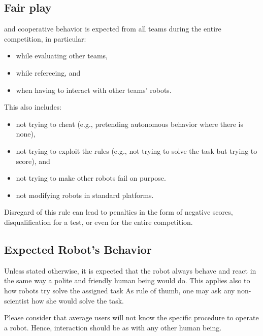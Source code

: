 \subsection{Fair play}
\label{rule:fairplay}
 and cooperative behavior is expected from all teams during the entire competition, in particular:
\begin{itemize}
	\item while evaluating other teams,
	\item while refereeing, and
	\item when having to interact with other teams' robots.
\end{itemize}
This also includes:
\begin{itemize}
	\item not trying to cheat (e.g., pretending autonomous behavior where there is none),
	\item not trying to exploit the rules (e.g., not trying to solve the task but trying to score), and
	\item not trying to make other robots fail on purpose.
	\item not modifying robots in standard platforms.
\end{itemize}
Disregard of this rule can lead to penalties in the form of negative scores, disqualification for a test, or even for the entire competition.

\subsection{Expected Robot's Behavior}
Unless stated otherwise, it is expected that the robot always behave and react in the same way a polite and friendly human being would do.
This applies also to how robots try solve the assigned task
As rule of thumb, one may ask any non-scientist how she would solve the task.

Please consider that average users will not know the specific procedure to operate a robot.
Hence, interaction should be as with any other human being.


